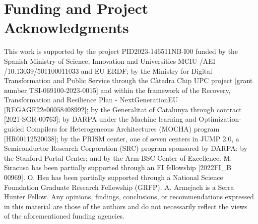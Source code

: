 \chapter*{Funding and Project Acknowledgments}
This work is supported by the project PID2023-146511NB-I00 funded by the Spanish Ministry of Science, Innovation and Universities MCIU /AEI /10.13039/501100011033 and EU ERDF; by the Ministry for Digital Transformation and Public Service through the Càtedra Chip UPC project [grant number TSI-069100-2023-0015] and within the framework of the Recovery, Transformation and Resilience Plan - NextGenerationEU [REGAGE22e00058408992]; by the Generalitat of Catalunya through contract [2021-SGR-00763]; by DARPA under the Machine learning and Optimization-guided Compilers for Heterogeneous Architectures (MOCHA) program [HR00112520038]; 
by the PRISM center, one of seven centers in JUMP 2.0, a Semiconductor Research Corporation (SRC) program sponsored by DARPA; by the Stanford Portal Center; and by the Arm-BSC Center of Excellence. M. Siracusa has been partially supported through an FI fellowship [2022FI\_B 00969]. O. Hsu has been partially supported through a National Science Foundation Graduate Research Fellowship (GRFP). A. Armejach is a Serra Hunter Fellow. Any opinions, findings, conclusions, or recommendations expressed in this material are those of the authors and do not necessarily reflect the views of the aforementioned funding agencies.
